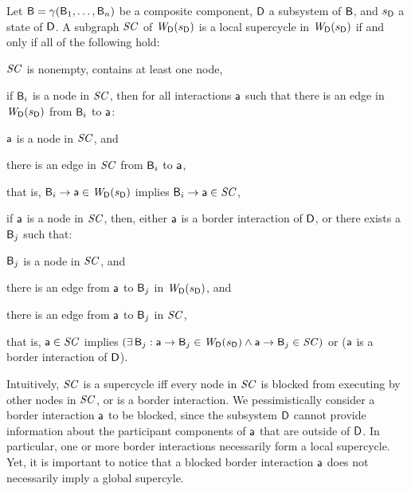 \begin{definition}
\label{defn:supercycleLoc} 
Let $\mathsf{B} = \gamma(\mathsf{B}_1,\dots,\mathsf{B}_n)$ be a composite component, %
$\mathsf{D}$ a subsystem of $\mathsf{B}$, and $s_\mathsf{D}$ a state of $\mathsf{D}$. 
A subgraph $\mathit{SC}$ of  $\mathit{W}_{\mathsf{D}}({s_\mathsf{D}})$ is a local supercycle in $\mathit{W}_{\mathsf{D}}({s_\mathsf{D}})$ if and only if all of the following hold:
\begin{nlst1}
   \item $\mathit{SC}$ is nonempty, \ie contains at least one node,

   \item if $\mathsf{B}_i$ is a node in $\mathit{SC}$, then for all interactions $\mathsf{a}$ such that
there is an edge in $\mathit{W}_{\mathsf{D}}({s_\mathsf{D}})$ from $\mathsf{B}_i$ to $\mathsf{a}$:
      \begin{nlst2}
      \item $\mathsf{a}$ is a node in $\mathit{SC}$, and 
      \item there is an edge in $\mathit{SC}$ from $\mathsf{B}_i$ to $\mathsf{a}$,
      \end{nlst2}
that is, $\mathsf{B}_i \rightarrow \mathsf{a} \in \mathit{W}_{\mathsf{D}}({s_\mathsf{D}})$ implies $\mathsf{B}_i \rightarrow \mathsf{a} \in \mathit{SC}$,

   \item 
if $\mathsf{a}$ is a node in $\mathit{SC}$, then, either $\mathsf{a}$ is a border interaction of $\mathsf{D}$, or  there exists a $\mathsf{B}_j$ such that:
      \begin{nlst2}
      \item $\mathsf{B}_j$  is a node in $\mathit{SC}$, and
      \item there is an edge from $\mathsf{a}$ to $\mathsf{B}_j$ in $\mathit{W}_{\mathsf{D}}({s_\mathsf{D}})$, and
      \item there is an edge from $\mathsf{a}$ to $\mathsf{B}_j$ in $\mathit{SC}$,
      \end{nlst2}
that is, $\mathsf{a} \in \mathit{SC}$ implies
$(\exists\, \mathsf{B}_j : \mathsf{a} \rightarrow \mathsf{B}_j \in \mathit{W}_{\mathsf{D}}({s_\mathsf{D}}) \land \mathsf{a} \rightarrow \mathsf{B}_j \in \mathit{SC})$ or
($\mathsf{a}$ is a border interaction of $\mathsf{D}$).

\end{nlst1}
\end{definition}
Intuitively, $\mathit{SC}$ is a supercycle iff every node in $\mathit{SC}$ is blocked from executing by other nodes in $\mathit{SC}$, or is a border interaction. We pessimistically consider a border
interaction $\mathsf{a}$ to be blocked, since the subsystem $\mathsf{D}$ cannot provide information about the participant components of $\mathsf{a}$ that are outside of
$\mathsf{D}$. In particular, one or more border interactions necessarily form a local supercycle. Yet, it is important to notice that a blocked border interaction $\mathsf{a}$ does
not necessarily imply a global supercyle.


